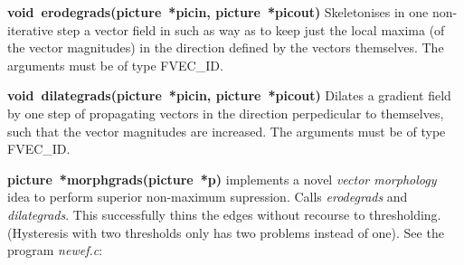 \documentclass[11pt,twoside,english,a4paper]{article}
\begin{document}
\textbf{void~erodegrads(picture~{*}picin,  picture~{*}picout)} Skeletonises in one non-iterative step
a vector field in such as way as to keep just the local maxima (of the vector magnitudes)
in the direction defined by  the vectors themselves. The arguments must be of type FVEC\_ID.

\textbf{void~dilategrads(picture~{*}picin, picture~{*}picout)} Dilates a gradient field
by one step of propagating vectors in the direction perpedicular to themselves, such that the vector
magnitudes are increased. The arguments must be of type FVEC\_ID.

\textbf{picture~{*}morphgrads(picture~{*p})} 
implements a novel \emph{vector morphology} 
idea to perform superior non-maximum supression. Calls \emph{erodegrads}
and \emph{dilategrads}. This successfully thins the edges without recourse to thresholding. 
(Hysteresis with two thresholds only has two problems instead of one). 
See the program \emph{newef.c}:
\end{document}
